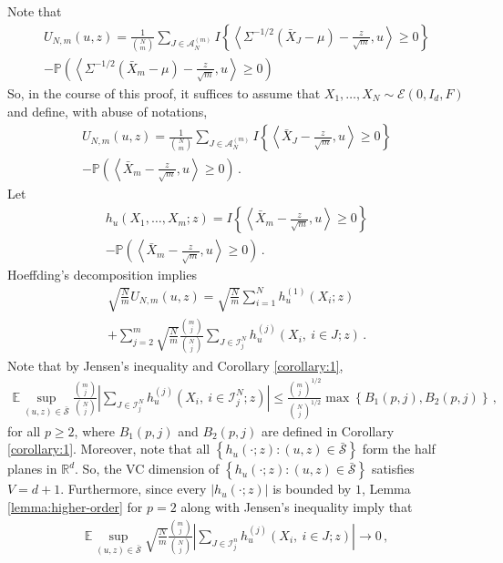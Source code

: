 \documentclass[12pt]{article}
\def\l{\left}
\def\r{\right}
\newcommand{\m}{\mathcal}
\newcommand{\mb}{\mathbb}
\newcommand{\pr}[1]{\mathbb{P}{\left(#1\right)}}
\newcommand{\dotp}[2]{\left\langle#1,#2\right\rangle}
\theoremstyle{thmstyletwo}%
\theoremstyle{thmstylethree}%
\begin{document}
Note that
\begin{multline*}
    U_{N,m}(u,z) = \frac{1}{{N\choose m}} \sum_{J\in \m A_{N}^{(m)} }I\left\{ \dotp{\Sigma^{-1/2}\l(\bar X_J - \mu\r) - \frac{z}{\sqrt{m}}}{u}\geq 0\right\} \\
    - \pr{\dotp{\Sigma^{-1/2}\l(\bar X_m - \mu\r) - \frac{z}{\sqrt{m}}}{u}\geq 0}
\end{multline*}
So, in the course of this proof, it suffices to assume that $X_1, \ldots, X_N \sim \mathcal{E}(0, I_d, F)$ and define, with abuse of notations, 
\begin{multline*}
    U_{N,m}(u,z) = \frac{1}{{N\choose m}} \sum_{J\in \m A_{N}^{(m)} }I\left\{ \dotp{\bar X_J - \frac{z}{\sqrt{m}}}{u}\geq 0\right\} \\
    - \pr{\dotp{\bar X_m  - \frac{z}{\sqrt{m}}}{u}\geq 0} \,.
\end{multline*}
Let
\begin{multline*}
    h_{u}(X_1, \ldots, X_m;z) = I\left\{ \dotp{\bar X_m - \frac{z}{\sqrt{m}}}{u}\geq 0\right\} \\
    - \pr{\dotp{\bar X_m  - \frac{z}{\sqrt{m}}}{u}\geq 0}\,.
\end{multline*}
Hoeffding's decomposition implies
\begin{multline*}
   \sqrt{\frac{N}{m}} U_{N,m}(u,z) = \sqrt{\frac{N}{m}} \sum_{i=1}^N h^{(1)}_{u}\l(X_i;z\r) \\
   + \sum_{j=2}^m \sqrt{\frac{N}{m}}\frac{{m \choose j}}{{N \choose j}} \sum_{J \in \mathcal{I}^N_j} h^{(j)}_{u}\l(X_i,\  i \in J;z\r)\,.
\end{multline*}
Note that by Jensen's inequality and Corollary \ref{corollary:1},
\begin{align*}
    \mb E \sup_{(u,z) \in \bar{\mathcal{S}}}  \frac{{m \choose j}}{{N \choose j}}\l\lvert  \sum_{J \in \mathcal{I}^N_j} h^{(j)}_{u}(X_i,\  i \in \mathcal{I}^N_j;z)\r\rvert   \leq \frac{{m \choose j}^{1/2}}{{N \choose j}^{1/2}}\max\l\{B_1(p,j), B_2(p,j) \r\} \,,
\end{align*}
for all $p \geq 2$, where $B_1(p,j)$ and $B_2(p,j)$ are defined in Corollary \ref{corollary:1}. Moreover, note that all $\l\{h_{u}(\cdot;z): (u,z) \in \bar{\mathcal{S}}\r\}$ form the half planes in $\mb R^d$. So, the VC dimension of $\l\{h_{u}(\cdot;z): (u,z) \in \bar{\mathcal{S}}\r\}$ satisfies $V = d+1$. Furthermore, since every $\l\lvert h_{u}(\cdot;z) \r\rvert $ is bounded by $1$, Lemma \ref{lemma:higher-order} for $p = 2$ along with Jensen's inequality imply that 
\begin{align}\label{eq:THL-remainder-vanish}
    \mb E\sup_{(u,z) \in \bar{\mathcal{S}}} \sqrt{\frac{N}{m}} \frac{{m \choose j}}{{N \choose j}}\l\lvert  \sum_{J \in \mathcal{I}^n_j} h^{(j)}_{u}\l(X_i,\  i \in J;z\r)\r\rvert \rightarrow 0\,,
\end{align}
\end{document}
